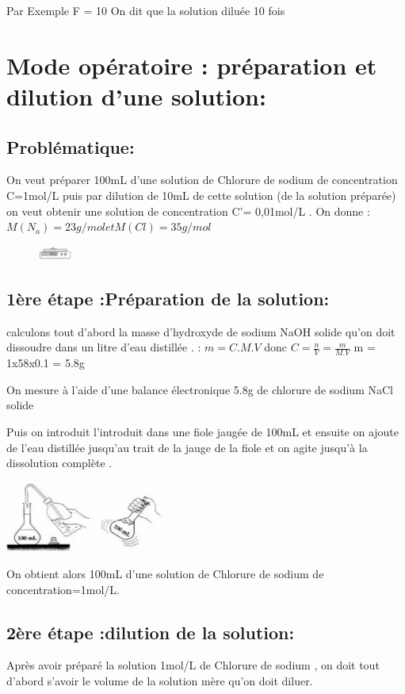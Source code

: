 \documentclass[12pt]{article}
\begin{document}
Par Exemple F = 10 On dit que la solution diluée 10 fois  
\section{Mode opératoire : préparation et dilution d'une solution:}
\subsection{Problématique:}
On veut préparer 100mL d'une solution de Chlorure de sodium de concentration C=1mol/L puis par dilution de
10mL de cette solution (de la solution préparée) on veut obtenir une solution de concentration C'= 0,01mol/L .
On donne :$M(N_a) = 23 g/mol et M(Cl) =35g/mol$

\begin{figure}
  \begin{center}
    \includegraphics[width=0.1\textwidth]{./img/balance.png}
  \end{center}
\end{figure}
\subsection{1ère étape :Préparation de la solution: }
calculons tout d'abord la masse d'hydroxyde de sodium NaOH solide qu'on doit dissoudre dans un litre d'eau
distillée . : $m = C.M.V$ donc $C = \frac{n}{V} = \frac{m}{M.V}$
m = 1x58x0.1 = 5.8g

On mesure à l'aide d'une balance électronique 5.8g de chlorure de sodium NaCl solide

Puis on introduit l'introduit dans une fiole jaugée de 100mL et ensuite on ajoute de l'eau distillée jusqu'au trait de la jauge de la fiole et on agite jusqu'à la dissolution complète .
\begin{center}
\includegraphics[width=0.4\textwidth]{./img/dilution_steps.png}
\end{center}
On obtient alors 100mL d'une solution de Chlorure de
sodium de concentration=1mol/L.

\subsection{2ère étape :dilution de la solution:}
Après avoir préparé la solution 1mol/L de Chlorure de sodium , on doit tout d'abord s'avoir le volume de la solution
mère qu'on doit diluer.
 
\end{document}
